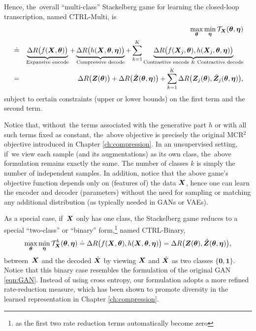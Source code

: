 \documentclass[\toplevelprefix/book-main.tex]{subfiles}
\begin{document}
Hence, the~overall ``multi-class''  Stackelberg game for learning the closed-loop transcription, named CTRL-Multi, is
\begin{eqnarray}
&&\max_{\bm \theta} \min_{\bm \eta} \mathcal{T}_{\bm{X}}(\bm \theta, \bm \eta) \\
&\doteq& \underbrace{\Delta R\big(f(\bm{X},\bm \theta)\big)}_{\text{Expansive encode}} + \underbrace{\Delta R\big(h(\bm{X},\bm \theta, \bm \eta)\big)}_{\text{Compressive decode}} + \sum_{k=1}^K \underbrace{\Delta R\big(f(\bm{X}_j,\bm \theta), h(\bm{X}_j,\bm \theta,\bm \eta)\big)}_{\text{Contrastive encode \& Contractive decode}} \nonumber \\
&=& \Delta R\big(\bm{Z}(\bm \theta) \big) + \Delta R\big(\hat {\bm{Z}}(\bm \theta, \bm \eta)\big) + \sum_{k=1}^K \Delta R\big(\bm{Z}_j(
\bm \theta), \hat {\bm{Z}}_j(\bm \theta, \bm \eta) \big),
    \label{eq:MCR2-GAN-objective}
\end{eqnarray}
subject to certain constraints (upper or lower bounds) on the first term and the second term.  %



Notice that, without~the terms associated with the generative part $h$ or with all such terms fixed as constant, the~above objective is precisely the original MCR$^2$ objective introduced in Chapter \ref{ch:compression}. In an unsupervised setting, if~we view each sample (and its augmentations) as its own class, the~above formulation remains exactly the same. The number of classes $k$ is simply the number of independent samples. In addition, notice that the above game's objective function depends only on (features of) the data $\bm{X}$, hence one can learn the encoder and decoder (parameters) without the need for sampling or matching any additional distribution (as typically needed in GANs or VAEs).

As a special case, if~$\bm{X}$ only has one class, the Stackelberg game reduces to a special ``two-class'' or ``binary''  form,\footnote{as the first two rate reduction terms automatically become zero} named CTRL-Binary, 
\begin{equation}
 \max_{\bm \theta} \min_{\bm \eta} \mathcal{T}^b_{\bm{X}}(\bm \theta, \bm \eta) \doteq \Delta R\big(f(\bm{X},\bm \theta), h(\bm{X},\bm \theta,\bm \eta)\big) = \Delta R\big(\bm{Z}(\bm \theta), \hat {\bm{Z}}(\bm \theta, \bm \eta)\big), 
    \label{eq:MCR2-GAN-objective-binary}
\end{equation}
between~$\bm{X}$ and the decoded $\hat{\bm{X}}$ by viewing $\bm{X}$ and $\hat {\bm{X}}$ as two classes $\{\bm 0, \bm 1\}$. Notice that this binary case resembles the formulation of the original GAN \eqref{eqn:GAN}. Instead of using cross entropy, our formulation adopts a more refined rate-reduction measure, which has been shown to promote diversity in the learned representation in Chapter \ref{ch:compression}. %
\end{document}
